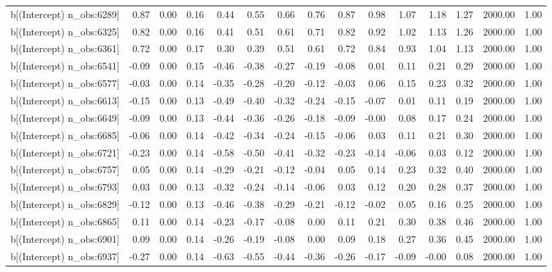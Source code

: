 \begin{table}[ht]
\begin{tabular}{rrrrrrrrrrrrrrr}
  b[(Intercept) n\_obs:6289] & 0.87 & 0.00 & 0.16 & 0.44 & 0.55 & 0.66 & 0.76 & 0.87 & 0.98 & 1.07 & 1.18 & 1.27 & 2000.00 & 1.00 \\ 
  b[(Intercept) n\_obs:6325] & 0.82 & 0.00 & 0.16 & 0.41 & 0.51 & 0.61 & 0.71 & 0.82 & 0.92 & 1.02 & 1.13 & 1.26 & 2000.00 & 1.00 \\ 
  b[(Intercept) n\_obs:6361] & 0.72 & 0.00 & 0.17 & 0.30 & 0.39 & 0.51 & 0.61 & 0.72 & 0.84 & 0.93 & 1.04 & 1.13 & 2000.00 & 1.00 \\ 
  b[(Intercept) n\_obs:6541] & -0.09 & 0.00 & 0.15 & -0.46 & -0.38 & -0.27 & -0.19 & -0.08 & 0.01 & 0.11 & 0.21 & 0.29 & 2000.00 & 1.00 \\ 
  b[(Intercept) n\_obs:6577] & -0.03 & 0.00 & 0.14 & -0.35 & -0.28 & -0.20 & -0.12 & -0.03 & 0.06 & 0.15 & 0.23 & 0.32 & 2000.00 & 1.00 \\ 
  b[(Intercept) n\_obs:6613] & -0.15 & 0.00 & 0.13 & -0.49 & -0.40 & -0.32 & -0.24 & -0.15 & -0.07 & 0.01 & 0.11 & 0.19 & 2000.00 & 1.00 \\ 
  b[(Intercept) n\_obs:6649] & -0.09 & 0.00 & 0.13 & -0.44 & -0.36 & -0.26 & -0.18 & -0.09 & -0.00 & 0.08 & 0.17 & 0.24 & 2000.00 & 1.00 \\ 
  b[(Intercept) n\_obs:6685] & -0.06 & 0.00 & 0.14 & -0.42 & -0.34 & -0.24 & -0.15 & -0.06 & 0.03 & 0.11 & 0.21 & 0.30 & 2000.00 & 1.00 \\ 
  b[(Intercept) n\_obs:6721] & -0.23 & 0.00 & 0.14 & -0.58 & -0.50 & -0.41 & -0.32 & -0.23 & -0.14 & -0.06 & 0.03 & 0.12 & 2000.00 & 1.00 \\ 
  b[(Intercept) n\_obs:6757] & 0.05 & 0.00 & 0.14 & -0.29 & -0.21 & -0.12 & -0.04 & 0.05 & 0.14 & 0.23 & 0.32 & 0.40 & 2000.00 & 1.00 \\ 
  b[(Intercept) n\_obs:6793] & 0.03 & 0.00 & 0.13 & -0.32 & -0.24 & -0.14 & -0.06 & 0.03 & 0.12 & 0.20 & 0.28 & 0.37 & 2000.00 & 1.00 \\ 
  b[(Intercept) n\_obs:6829] & -0.12 & 0.00 & 0.13 & -0.46 & -0.38 & -0.29 & -0.21 & -0.12 & -0.02 & 0.05 & 0.16 & 0.25 & 2000.00 & 1.00 \\ 
  b[(Intercept) n\_obs:6865] & 0.11 & 0.00 & 0.14 & -0.23 & -0.17 & -0.08 & 0.00 & 0.11 & 0.21 & 0.30 & 0.38 & 0.46 & 2000.00 & 1.00 \\ 
  b[(Intercept) n\_obs:6901] & 0.09 & 0.00 & 0.14 & -0.26 & -0.19 & -0.08 & 0.00 & 0.09 & 0.18 & 0.27 & 0.36 & 0.45 & 2000.00 & 1.00 \\ 
  b[(Intercept) n\_obs:6937] & -0.27 & 0.00 & 0.14 & -0.63 & -0.55 & -0.44 & -0.36 & -0.26 & -0.17 & -0.09 & -0.00 & 0.08 & 2000.00 & 1.00 \\ 

\end{tabular}
\end{table}
